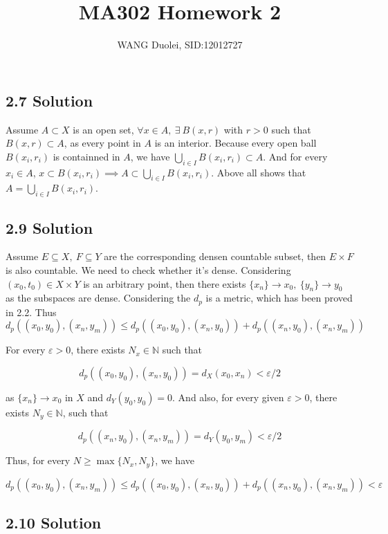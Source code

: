 \documentclass{article}
\title{MA302 Homework 2}
\author{WANG Duolei, SID:12012727}
\affil{wangdl2020@mail.sustech.edu.cn}
\date{}
\begin{document}
\maketitle



\subsection*{2.7 Solution}
Assume \(A \subset X\) is an open set, \(\forall x \in A,\ \exists\ B(x, r)\) with \(r > 0\) such that \(B(x, r) \subset A\), as every point in \(A\) is an interior. Because every open ball \(B(x_i, r_i)\) is containned in \(A\), we have \(\bigcup_{i \in I}B(x_i, r_i) \subset A\). And for every \(x_i \in A\), \(x \subset B(x_i, r_i) \implies A \subset \bigcup_{i \in I} B(x_i, r_i)\). Above all shows that \(A = \bigcup_{i \in I} B(x_i, r_i)\).



\subsection*{2.9 Solution}
Assume \(E \subseteq X,\ F \subseteq Y\) are the corresponding densen countable subset, then \(E \times F\) is also countable. We need to check whether it's dense. Considering \((x_0, t_0) \in X \times Y\) is an arbitrary point, then there exists \(\{x_n\} \to x_0,\ \{y_n\} \to y_0\) as the subspaces are dense. Considering the \(d_p\) is a metric, which has been proved in 2.2. Thus 
\[d_p((x_0, y_0), (x_n, y_m)) \le d_p((x_0, y_0), (x_n, y_0)) + d_p((x_n, y_0), (x_n, y_m))\]

For every \(\varepsilon > 0\), there exists \(N_x \in \mathbb N\) such that

\[d_p((x_0, y_0), (x_n, y_0)) = d_X(x_0, x_n) < \varepsilon/2\]

as \(\{x_n\} \to x_0\) in \(X\) and \(d_Y(y_0, y_0) = 0\). And also, for every given \(\varepsilon > 0\), there exists \(N_y \in \mathbb N\), such that

\[d_p((x_n, y_0), (x_n, y_m)) = d_Y(y_0, y_m) < \varepsilon/2 \] 

Thus, for every \(N \ge \max\{N_x, N_y\}\), we have 

\[d_p((x_0, y_0), (x_n, y_m)) \le d_p((x_0, y_0), (x_n, y_0)) + d_p((x_n, y_0), (x_n, y_m)) < \varepsilon\]

\subsection*{2.10 Solution}
\end{document}
